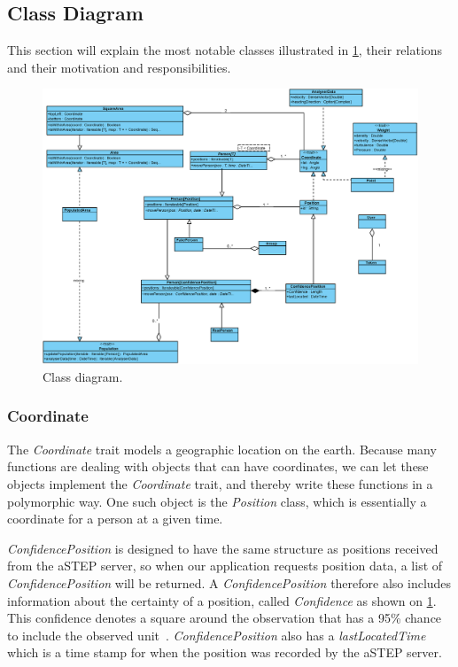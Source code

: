 \subsection{Class Diagram}
This section will explain the most notable classes illustrated in \cref{fig:class}, their relations and their motivation and responsibilities.

\begin{figure}
\centering
\includegraphics[width=\linewidth]{figures/class.eps}
\caption{Class diagram.}
\label{fig:class}
\end{figure}

\subsubsection{Coordinate}
The \emph{Coordinate} trait models a geographic location on the earth. Because many functions are dealing with objects that can have coordinates, we can let these objects implement the \emph{Coordinate} trait, and thereby write these functions in a polymorphic way. One such object is the \emph{Position} class, which is essentially a coordinate for a person at a given time.

\emph{ConfidencePosition} is designed to have the same structure as positions received from the aSTEP server, so when our application requests position data, a list of \emph{ConfidencePosition} will be returned. A \emph{ConfidencePosition} therefore also includes information about the certainty of a position, called \emph{Confidence} as shown on \cref{fig:class}. This confidence denotes a square around the observation that has a 95\% chance to include the observed unit~\cite{cisco}. \emph{ConfidencePosition} also has a \emph{lastLocatedTime} which is a time stamp for when the position was recorded by the aSTEP server.

